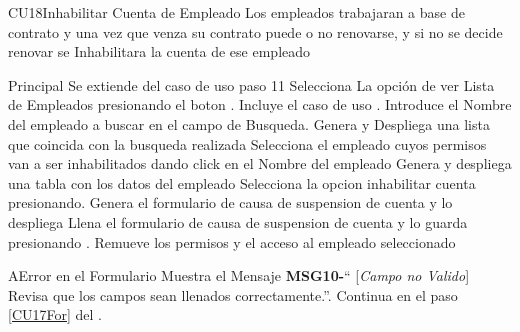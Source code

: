 \begin{UseCase}{CU18}{Inhabilitar Cuenta de Empleado}{
		Los empleados trabajaran a base de contrato y una vez que venza su contrato puede o no renovarse, y si no se decide renovar se Inhabilitara la cuenta de ese empleado
	}
	\end{UseCase}
	\begin{UCtrayectoria}{Principal}
		\UCpaso Se extiende del caso de uso  paso 11
		\UCpaso[\UCactor] Selecciona La opción de ver Lista de  Empleados presionando el boton .
		\UCpaso Incluye el caso de uso .
		\UCpaso[\UCactor] Introduce el Nombre del empleado a buscar en el campo de Busqueda.
		\UCpaso Genera y Despliega una lista que coincida con la busqueda realizada
		\UCpaso[\UCactor] Selecciona el empleado cuyos permisos van a ser inhabilitados dando click en el Nombre del empleado
		\UCpaso Genera y despliega una tabla con los datos del empleado
		\UCpaso[\UCactor] Selecciona la opcion inhabilitar cuenta presionando.
		\UCpaso Genera el formulario de causa de suspension de cuenta y  lo despliega 
		\UCpaso[\UCactor] Llena el formulario de causa de suspension de cuenta y lo guarda presionando    \label{CU17For}.
		\UCpaso Remueve los permisos y el acceso al empleado seleccionado 
	\end{UCtrayectoria}



		 \begin{UCtrayectoriaA}{A}{Error en el Formulario}
			\UCpaso Muestra el Mensaje {\bf MSG10-}`` [{\em Campo no Valido}] Revisa que los campos sean llenados correctamente.''.
			\UCpaso Continua en el paso \ref{CU17For} del .
		\end{UCtrayectoriaA}
